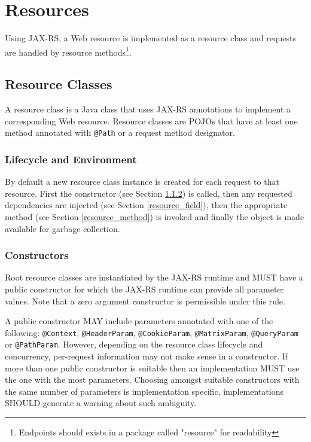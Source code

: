 \chapter{Resources}
\label{resources}

Using JAX-RS, \textcolor{highlight green}{a Web resource is implemented as a resource class and requests are handled by
resource methods}\footnote{Endpoints should exists in a package called "resource" for readability}.

\section{Resource Classes}

\textcolor{highlight green}{A resource class is a Java class that uses JAX-RS annotations to implement a corresponding
Web resource. Resource classes are POJOs that have at least one method annotated with \lstinline{@Path} or a request method
designator}.

\subsection{Lifecycle and Environment}

\textcolor{highlight green}{By default a new resource class instance is created for each request} to that resource.
First the constructor (see Section \ref{resource_class_constructor}) is called, then any requested dependencies are
injected (see Section \ref{resource_field}), then the appropriate method (see Section \ref{resource_method}) is invoked
and finally the object is made available for garbage collection.

\subsection{Constructors}
\label{resource_class_constructor}

Root resource classes are instantiated by the JAX-RS runtime and MUST have a public constructor for which the JAX-RS
runtime can provide all parameter values. Note that a zero argument constructor is permissible under this rule.

A public constructor MAY include parameters annotated with one of the following: \lstinline{@Context},
\lstinline{@HeaderParam}, \lstinline{@CookieParam}, \lstinline{@MatrixParam}, \lstinline{@QueryParam} or
\lstinline{@PathParam}. However, depending on the resource class lifecycle and concurrency, per-request information may
not make sense in a constructor. If more than one public constructor is suitable then an implementation MUST use the one
with the most parameters. Choosing amongst suitable constructors with the same number of parameters is implementation
specific, implementations SHOULD generate a warning about such ambiguity.

